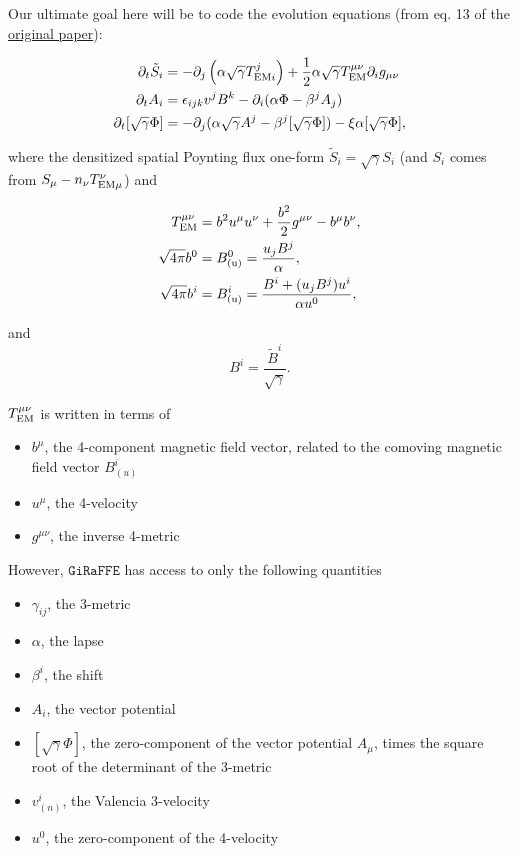 \documentclass[landscape,letterpaper,10pt,english]{article}
\providecommand{\tightlist}{%
      \setlength{\itemsep}{0pt}\setlength{\parskip}{0pt}}
\begin{document}
    Our ultimate goal here will be to code the evolution equations (from eq.
13 of the \href{https://arxiv.org/pdf/1704.00599.pdf}{original paper}):

\begin{align}
\partial_t \tilde{S}_i &= - \partial_j \left( \alpha \sqrt{\gamma} T^j_{{\rm EM} i} \right) + \frac{1}{2} \alpha \sqrt{\gamma} T^{\mu \nu}_{\rm EM} \partial_i g_{\mu \nu}\\
\partial_t A_i &= \epsilon_{ijk} v^j B^k - \partial_i (\alpha \Phi - \beta^j A_j)\\
\partial_t [\sqrt{\gamma} \Phi] &= -\partial_j (\alpha\sqrt{\gamma}A^j - \beta^j [\sqrt{\gamma} \Phi]) - \xi \alpha [\sqrt{\gamma} \Phi],
\end{align}

where the densitized spatial Poynting flux one-form
\(\tilde{S}_i = \sqrt{\gamma} S_i\) (and \(S_i\) comes from
\(S_{\mu} -n_{\nu} T^{\nu}_{{\rm EM} \mu}\)) and

\begin{align}
T^{\mu \nu}_{\rm EM} &= b^2 u^{\mu} u^{\nu} + \frac{b^2}{2} g^{\mu \nu} - b^{\mu} b^{\nu}, \\
\sqrt{4\pi} b^0 &= B^0_{\rm (u)} = \frac{u_j B^j}{\alpha}, \\
\sqrt{4\pi} b^i &= B^i_{\rm (u)} = \frac{B^i + (u_j B^j) u^i}{\alpha u^0}, \\
\end{align}

and \[
 B^i = \frac{\tilde{B}^i}{\sqrt{\gamma}}.\]

\(T^{\mu\nu}_{\rm EM}\) is written in terms of

\begin{itemize}
\tightlist
\item
  \(b^\mu\), the 4-component magnetic field vector, related to the
  comoving magnetic field vector \(B^i_{(u)}\)
\item
  \(u^\mu\), the 4-velocity
\item
  \(g^{\mu \nu}\), the inverse 4-metric
\end{itemize}

However, \(\texttt{GiRaFFE}\) has access to only the following
quantities

\begin{itemize}
\tightlist
\item
  \(\gamma_{ij}\), the 3-metric
\item
  \(\alpha\), the lapse
\item
  \(\beta^i\), the shift
\item
  \(A_i\), the vector potential
\item
  \(\left[\sqrt{\gamma}\Phi\right]\), the zero-component of the vector
  potential \(A_\mu\), times the square root of the determinant of the
  3-metric
\item
  \(v_{(n)}^i\), the Valencia 3-velocity
\item
  \(u^0\), the zero-component of the 4-velocity
\end{itemize}
\end{document}
